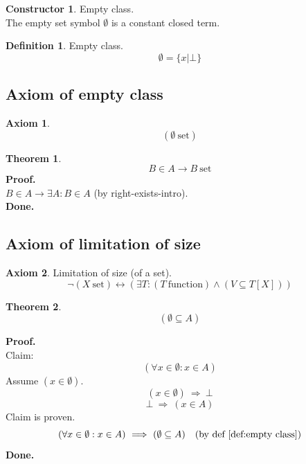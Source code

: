 \documentclass[10pt,a4paper]{article}
\theoremstyle{definition}
\newtheorem{constructor}{Constructor}[section]
\newtheorem{axiom}{Axiom}
\newtheorem{definition}{Definition}[section]
\newtheorem{theorem}{Theorem}[section]
\newcommand{\Done}{\noindent \textbf{Done.}\\}
\newcommand{\function}{\mathrm{\ function}}
\newcommand{\IMPLIES}{\ \Longrightarrow\ }
\newcommand{\Proof}{\noindent \textbf{Proof.}\\}
\newcommand{\set}{\mathrm{\ set}}
\begin{document}
\begin{constructor} Empty class.\\
The empty set symbol $\emptyset$ is a constant closed term.
\end{constructor}
\begin{definition}
\label{def:empty class}
Empty class.
\[
\emptyset = \{x|\bot\}
\]
\end{definition}

\subsection{Axiom of empty class}
\begin{axiom}
\label{axm:empty class}
\[
(\emptyset\set)
\]
\end{axiom}

\begin{theorem}
\label{thm:in class then set}
\[
B\in A \rightarrow B\set
\]
\Proof
$B\in A \rightarrow \exists A: B\in A$ (by right-exists-intro).\\
\Done
\end{theorem}

\subsection{Axiom of limitation of size}
\begin{axiom}
\label{axm:limitation of size}
Limitation of size (of a set).
\[
\neg(X\set) \longleftrightarrow (\exists T: (T\function)\land (V\subseteq T[X]))
\]
\end{axiom}

\begin{theorem}
\label{thm:empty class is subclass}
\[
(\emptyset\subseteq A)
\]
\end{theorem}
\Proof
Claim:
\[
(\forall x\in \emptyset: x\in A)
\]
Assume $(x\in\emptyset)$.
\[
(x\in\emptyset)
\IMPLIES
\bot
\]
\[
\bot
\IMPLIES
(x\in A)
\]
Claim is proven.
\[
(\forall x\in \emptyset: x\in A)
\IMPLIES
(\emptyset\subseteq A)
\quad\mbox{(by def \ref{def:empty class})}
\]
\Done
\end{document}
